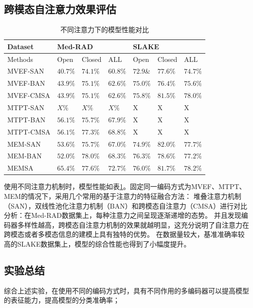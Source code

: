 \subsection{跨模态自注意力效果评估}
\begin{table}
	\caption{\label{tab:modal_red_cmp}不同注意力下的模型性能对比}
	\centering
	\small
	\begin{tabular}{l|lll|lll}
		\hline Dataset & \multicolumn{3}{l}{\textbf{Med-RAD}} & \multicolumn{3}{|l}{\textbf{SLAKE}} \\ 
		\hline Methods & Open & Closed & ALL & Open & Closed & ALL\\
		\hline MVEF-SAN\cite{nguyen2019overcoming} & $40.7 \%$ & $74.1 \%$ & $60.8 \%$ & $72.9 \&$ & $77.6 \%$ & $74.7 \%$\\
		MVEF-BAN\cite{nguyen2019overcoming} & $43.9 \%$ & $75.1 \%$ & $62.6 \%$ & $75.0 \%$ & $76.4 \%$ & $75.6 \%$\\
		MVEF-CMSA & $43.9 \%$ & $75.1 \%$ & $62.6 \%$ & $75.8 \%$ & $81.5\%$ & $78.0\%$\\
		\hline MTPT-SAN & $X \%$ & $X \%$ & $X \%$ & X & X & X\\
		MTPT-BAN\cite{gong2021cross} & $56.1 \%$ & $75.7 \%$ & $67.9 \%$ & X & X & X\\
		MTPT-CMSA\cite{gong2021cross} & $56.1 \%$ & $77.3 \%$ & $68.8 \%$ & X & X & X\\
		\hline MEM-SAN & $53.6 \%$ & $75.7 \%$ & $67.0 \%$ & $74.9 \%$ & $82.0 \%$ & $77.7 \%$\\
		MEM-BAN & $52.0 \%$ & $78.0 \%$ & $68.3 \%$ & $\mathbf{76.3} \%$ & $78.6 \%$ & $77.2 \%$\\
		MEMSA & $\mathbf{65.4 \%}$ & $77.6 \%$ & $\mathbf{72.7 \%}$ & $76.0 \%$ & $81.7 \%$ & $\mathbf{78.2 \%}$\\
		\hline
		\end{tabular}
\end{table}
使用不同注意力机制时，模型性能如表\ref{tab:modal_red_cmp}。固定同一编码方式为MVEF、MTPT、MEM的情况下，采用几个常用的基于注意力的特征融合方法：
堆叠注意力机制（SAN），双线性池化注意力机制（BAN）和跨模态自注意力（CMSA）进行对比分析：在Med-RAD数据集上，每种注意力之间呈现逐渐递增的态势。
并且发现编码器多样性越高，跨模态自注意力机制的效果就越明显，这充分说明了自注意力在跨模态或者多模态信息的建模上具有独特的优势。
在数据量较大，基准准确率较高的SLAKE数据集上，模型的综合性能也得到了小幅度提升。

\subsection{实验总结}
综合上述实验，在使用不同的编码方式时，具有不同作用的多编码器可以提高模型的表征能力，提高模型的分类准确率；

